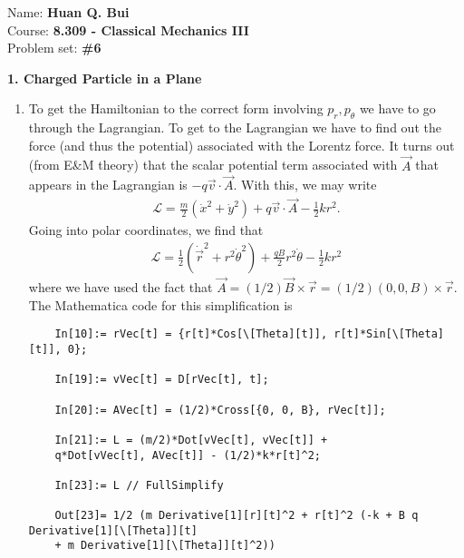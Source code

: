 \documentclass{article}
\theoremstyle{definition}
\newcommand{\lag}{\mathcal{L}}
\newcommand{\f}[2]{\frac{#1}{#2}}
\newcommand{\lp}{\left(}
\newcommand{\rp}{\right)}
\begin{document}
	
\begin{framed}
	\noindent Name: \textbf{Huan Q. Bui}\\
	Course: \textbf{8.309 - Classical Mechanics III}\\
	Problem set: \textbf{\#6}
\end{framed}




\noindent \textbf{1. Charged Particle in a Plane}


\begin{enumerate}[label=(\alph*)]
	\item To get the Hamiltonian to the correct form involving $p_r, p_\theta$ we have to go through the Lagrangian. To get to the Lagrangian we have to find out the force (and thus the potential) associated with the Lorentz force. It turns out (from E\&M theory) that the scalar potential term associated with $\vec{A}$ that appears in the Lagrangian is $-q\vec{v}\cdot \vec{A}$. With this, we may write
	\begin{align*}
	\lag = \f{m}{2}(\dot x^2 + \dot y^2) + q \vec{v} \cdot \vec{A} - \f{1}{2}kr^2.
	\end{align*}
	Going into polar coordinates, we find that
	\begin{align*}
	\lag = \f{1}{2}\lp \dot{\vec{r}}^2 + r^2 \dot\theta^2 \rp + \f{qB }{2} r^2\dot\theta - \f{1}{2}kr^2 
	\end{align*}
	where we have used the fact that $\vec{A} = (1/2)\vec{B}\times \vec{r} = (1/2)(0,0,B)\times \vec{r}$. The Mathematica code for this simplification is 
	\begin{lstlisting}
	In[10]:= rVec[t] = {r[t]*Cos[\[Theta][t]], r[t]*Sin[\[Theta][t]], 0};
	
	In[19]:= vVec[t] = D[rVec[t], t];
	
	In[20]:= AVec[t] = (1/2)*Cross[{0, 0, B}, rVec[t]];
	
	In[21]:= L = (m/2)*Dot[vVec[t], vVec[t]] + 
	q*Dot[vVec[t], AVec[t]] - (1/2)*k*r[t]^2;
	
	In[23]:= L // FullSimplify
	
	Out[23]= 1/2 (m Derivative[1][r][t]^2 + r[t]^2 (-k + B q Derivative[1][\[Theta]][t] 
	+ m Derivative[1][\[Theta]][t]^2))
	\end{lstlisting}
	

\end{enumerate}
\end{document}

